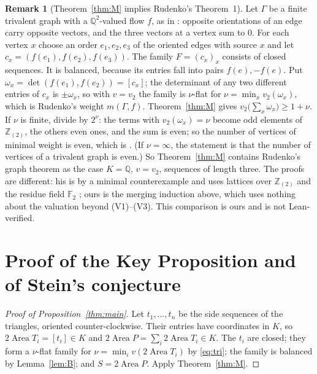 \documentclass[11pt]{article}
\theoremstyle{definition}
\newtheorem{remark}[theorem]{Remark}
\newcommand{\Q}{\mathbb{Q}}
\newcommand{\Z}{\mathbb{Z}}
\newcommand{\F}{\mathbb{F}}
\newcommand{\Area}{\operatorname{Area}}
\newcommand{\ar}[1]{[#1]}
\begin{document}
\begin{remark}[Theorem~\ref{thm:M} implies Rudenko's Theorem~1]\label{rem:rud}
Let $\Gamma$ be a finite trivalent graph with a $\Q^2$-valued flow $f$, as in \cite{Rud}: opposite
orientations of an edge carry opposite vectors, and the three vectors at a vertex sum to $0$. For
each vertex $x$ choose an order $e_1,e_2,e_3$ of the oriented edges with source $x$ and let
$c_x=(f(e_1),f(e_2),f(e_3))$. The family $F=(c_x)_x$ consists of closed sequences. It is balanced,
because its entries fall into pairs $f(e),-f(e)$. Put $\omega_x=\det(f(e_1),f(e_2))=\ar{c_x}$; the
determinant of any two different entries of $c_x$ is $\pm\omega_x$, so with $v=v_2$ the family is
$\nu$-flat for $\nu=\min_xv_2(\omega_x)$, which is Rudenko's weight $m(\Gamma,f)$.
Theorem~\ref{thm:M} gives $v_2\bigl(\sum_x\omega_x\bigr)\ge1+\nu$. If $\nu$ is finite, divide by
$2^\nu$: the terms with $v_2(\omega_x)=\nu$ become odd elements of $\Z_{(2)}$, the others even ones,
and the sum is even; so the number of vertices of minimal weight is even, which is \cite[Theorem
1]{Rud}. (If $\nu=\infty$, the statement is that the number of vertices of a trivalent graph is
even.) So Theorem~\ref{thm:M} contains Rudenko's graph theorem as the case $K=\Q$, $v=v_2$, sequences
of length three. The proofs are different: his is by a minimal counterexample and uses lattices
over $\Z_{(2)}$ and the residue field $\F_2$ \cite[Section 2]{Rud}; ours is the merging induction
above, which uses nothing about the valuation beyond (V1)--(V3). This comparison is ours and is not
Lean-verified.
\end{remark}

\section{Proof of the Key Proposition and of Stein's conjecture}\label{sec:end}

\begin{proof}[Proof of Proposition~\ref{thm:main}]
Let $t_1,\dots,t_n$ be the side sequences of the triangles, oriented counter-clockwise. Their
entries have coordinates in $K$, so $2\Area T_i=\ar{t_i}\in K$ and $2\Area P=\sum_i2\Area T_i\in K$.
The $t_i$ are closed; they form a $\nu$-flat family for $\nu=\min_iv(2\Area T_i)$ by \eqref{eq:tri};
the family is balanced by Lemma~\ref{lem:B}; and $S=2\Area P$. Apply Theorem~\ref{thm:M}.
\end{proof}
\end{document}

